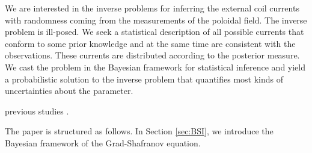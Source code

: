 We are interested in the inverse problems for inferring the external coil currents with randomness coming from the measurements of the poloidal field. The inverse problem is ill-posed. We seek a statistical description of all possible currents that conform to some prior knowledge and at the same time are consistent with the observations. These currents are distributed according to the posterior measure. We cast the problem in the Bayesian framework for statistical inference and yield a probabilistic solution to the inverse problem that quantifies most kinds of uncertainties about the parameter.

previous studies \cite{LiLuWa:2021}.


The paper is structured as follows. In Section \ref{sec:BSI}, we introduce the Bayesian framework of the Grad-Shafranov equation.